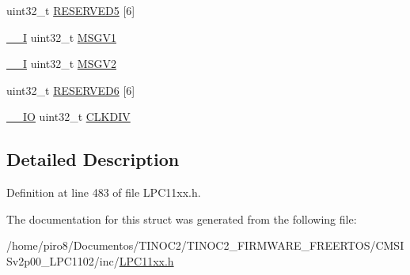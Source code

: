\begin{DoxyCompactItemize}
\item 
uint32\+\_\+t \hyperlink{group___l_p_c11xx___definitions_gada2e33a50c45e694cde5d08bca108a07}{R\+E\+S\+E\+R\+V\+E\+D5} \mbox{[}6\mbox{]}
\item 
\hyperlink{group___c_m_s_i_s__core__definitions_gaf63697ed9952cc71e1225efe205f6cd3}{\+\_\+\+\_\+I} uint32\+\_\+t \hyperlink{group___l_p_c11xx___definitions_ga762d98c04b8192bf57bae042e5c7bfb2}{M\+S\+G\+V1}
\item 
\hyperlink{group___c_m_s_i_s__core__definitions_gaf63697ed9952cc71e1225efe205f6cd3}{\+\_\+\+\_\+I} uint32\+\_\+t \hyperlink{group___l_p_c11xx___definitions_ga2237b693c88eca2620ed971623c6db5f}{M\+S\+G\+V2}
\item 
uint32\+\_\+t \hyperlink{group___l_p_c11xx___definitions_gac9d8872ef23421105e28b5c87ebcbbc4}{R\+E\+S\+E\+R\+V\+E\+D6} \mbox{[}6\mbox{]}
\item 
\hyperlink{group___c_m_s_i_s__core__definitions_gaec43007d9998a0a0e01faede4133d6be}{\+\_\+\+\_\+\+IO} uint32\+\_\+t \hyperlink{group___l_p_c11xx___definitions_ga4a89a19bd8d6a91479a7d60830850bbd}{C\+L\+K\+D\+IV}
\end{DoxyCompactItemize}


\subsection{Detailed Description}


Definition at line 483 of file L\+P\+C11xx.\+h.



The documentation for this struct was generated from the following file\+:\begin{DoxyCompactItemize}
\item 
/home/piro8/\+Documentos/\+T\+I\+N\+O\+C2/\+T\+I\+N\+O\+C2\+\_\+\+F\+I\+R\+M\+W\+A\+R\+E\+\_\+\+F\+R\+E\+E\+R\+T\+O\+S/\+C\+M\+S\+I\+Sv2p00\+\_\+\+L\+P\+C1102/inc/\hyperlink{_l_p_c11xx_8h}{L\+P\+C11xx.\+h}\end{DoxyCompactItemize}
